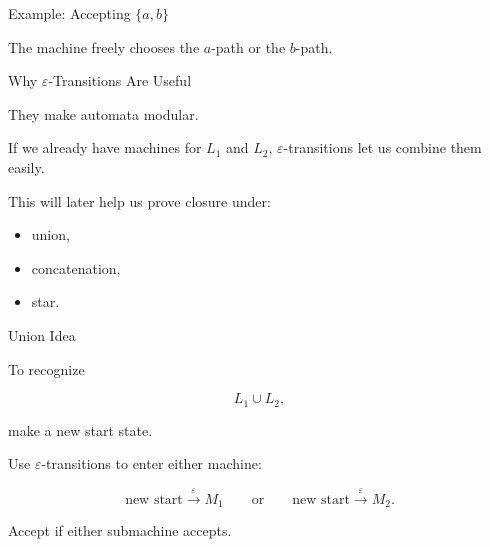 \documentclass[10pt,aspectratio=169]{beamer}
\newcommand{\eps}{\varepsilon}
\begin{document}
\begin{frame}{Example: Accepting \(\{a,b\}\)}

\begin{center}
\end{center}

\vspace{0.5em}

The machine freely chooses the \(a\)-path or the \(b\)-path.

\end{frame}

\begin{frame}{Why \(\eps\)-Transitions Are Useful}

They make automata modular.

\vspace{1em}

If we already have machines for \(L_1\) and \(L_2\), \(\eps\)-transitions let us combine them easily.

\vspace{1em}

This will later help us prove closure under:

\begin{itemize}
\item union,
\item concatenation,
\item star.
\end{itemize}

\end{frame}

\begin{frame}{Union Idea}

To recognize

\[
L_1\cup L_2,
\]

make a new start state.

\vspace{1em}

Use \(\eps\)-transitions to enter either machine:

\[
\text{new start}
\overset{\eps}{\longrightarrow}
M_1
\qquad
\text{or}
\qquad
\text{new start}
\overset{\eps}{\longrightarrow}
M_2.
\]

\vspace{1em}

Accept if either submachine accepts.

\end{frame}
\end{document}

